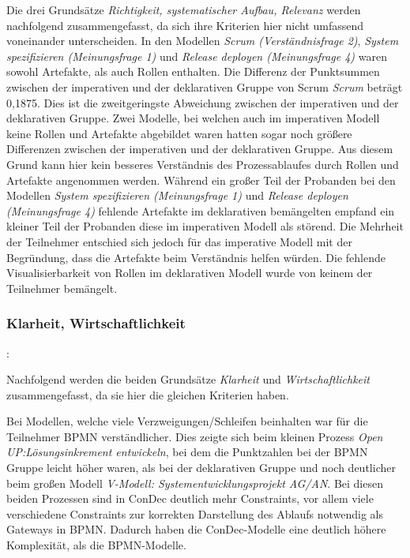 Die drei Grundsätze \textit{Richtigkeit, systematischer Aufbau, Relevanz} werden nachfolgend zusammengefasst, da sich ihre Kriterien hier nicht umfassend voneinander unterscheiden.\newline
In den Modellen \textit{Scrum (Verständnisfrage 2)}, \textit{System spezifizieren (Meinungsfrage 1)} und \textit{Release deployen (Meinungsfrage 4)} waren sowohl Artefakte, als auch Rollen enthalten. Die Differenz der Punktsummen zwischen der imperativen und der deklarativen Gruppe von Scrum \textit{Scrum} beträgt 0,1875. Dies ist die zweitgeringste Abweichung zwischen der imperativen und der deklarativen Gruppe. Zwei Modelle, bei welchen auch im imperativen Modell keine Rollen und Artefakte abgebildet waren hatten sogar noch größere Differenzen zwischen der imperativen und der deklarativen Gruppe. Aus diesem Grund kann hier kein besseres Verständnis des Prozessablaufes durch Rollen und Artefakte angenommen werden. \newline
Während ein großer Teil der Probanden bei den Modellen \textit{System spezifizieren (Meinungsfrage 1)} und \textit{Release deployen (Meinungsfrage 4)} fehlende Artefakte im deklarativen bemängelten empfand ein kleiner Teil der Probanden diese im imperativen Modell als störend. Die Mehrheit der Teilnehmer entschied sich jedoch für das imperative Modell mit der Begründung, dass die Artefakte beim Verständnis helfen würden. Die fehlende Visualisierbarkeit von Rollen im deklarativen Modell wurde von keinem der Teilnehmer bemängelt.\newline



\subsubsection{Klarheit, Wirtschaftlichkeit}: 

Nachfolgend werden die beiden Grundsätze \textit{Klarheit} und \textit{Wirtschaftlichkeit} zusammengefasst, da sie hier die gleichen Kriterien haben.\newline

Bei Modellen, welche viele Verzweigungen/Schleifen beinhalten war für die Teilnehmer BPMN verständlicher. Dies zeigte sich beim kleinen Prozess \textit{Open UP:Lösungsinkrement entwickeln}, bei dem die Punktzahlen bei der BPMN Gruppe leicht höher waren, als bei der deklarativen Gruppe und noch deutlicher beim großen Modell \textit{V-Modell: Systementwicklungsprojekt AG/AN}. Bei diesen beiden Prozessen sind in ConDec deutlich mehr Constraints, vor allem viele verschiedene Constraints zur korrekten Darstellung des Ablaufs notwendig als Gateways in BPMN. Dadurch haben die ConDec-Modelle eine deutlich höhere Komplexität, als die BPMN-Modelle.\newline

